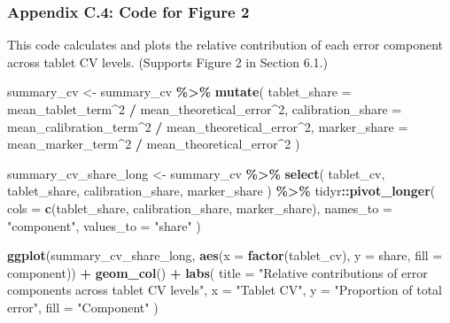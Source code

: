 \documentclass[
  12pt,
]{article}
\newenvironment{Shaded}{\begin{snugshade}}{\end{snugshade}}
\newcommand{\AttributeTok}[1]{\textcolor[rgb]{0.13,0.29,0.53}{#1}}
\newcommand{\DecValTok}[1]{\textcolor[rgb]{0.00,0.00,0.81}{#1}}
\newcommand{\FunctionTok}[1]{\textcolor[rgb]{0.13,0.29,0.53}{\textbf{#1}}}
\newcommand{\NormalTok}[1]{#1}
\newcommand{\OtherTok}[1]{\textcolor[rgb]{0.56,0.35,0.01}{#1}}
\newcommand{\SpecialCharTok}[1]{\textcolor[rgb]{0.81,0.36,0.00}{\textbf{#1}}}
\newcommand{\StringTok}[1]{\textcolor[rgb]{0.31,0.60,0.02}{#1}}
\begin{document}
\subsubsection{Appendix C.4: Code for Figure
2}\label{appendix-c.4-code-for-figure-2}

This code calculates and plots the relative contribution of each error
component across tablet CV levels. (Supports Figure 2 in Section 6.1.)

\begin{Shaded}
\begin{Highlighting}[]
\NormalTok{summary\_cv }\OtherTok{\textless{}{-}}\NormalTok{ summary\_cv }\SpecialCharTok{\%\textgreater{}\%}
  \FunctionTok{mutate}\NormalTok{(}
    \AttributeTok{tablet\_share =}\NormalTok{ mean\_tablet\_term}\SpecialCharTok{\^{}}\DecValTok{2} \SpecialCharTok{/}\NormalTok{ mean\_theoretical\_error}\SpecialCharTok{\^{}}\DecValTok{2}\NormalTok{,}
    \AttributeTok{calibration\_share =}\NormalTok{ mean\_calibration\_term}\SpecialCharTok{\^{}}\DecValTok{2} \SpecialCharTok{/}\NormalTok{ mean\_theoretical\_error}\SpecialCharTok{\^{}}\DecValTok{2}\NormalTok{,}
    \AttributeTok{marker\_share =}\NormalTok{ mean\_marker\_term}\SpecialCharTok{\^{}}\DecValTok{2} \SpecialCharTok{/}\NormalTok{ mean\_theoretical\_error}\SpecialCharTok{\^{}}\DecValTok{2}
\NormalTok{)}

\NormalTok{summary\_cv\_share\_long }\OtherTok{\textless{}{-}}\NormalTok{ summary\_cv }\SpecialCharTok{\%\textgreater{}\%}
  \FunctionTok{select}\NormalTok{(}
\NormalTok{    tablet\_cv,}
\NormalTok{    tablet\_share,}
\NormalTok{    calibration\_share,}
\NormalTok{    marker\_share}
\NormalTok{  ) }\SpecialCharTok{\%\textgreater{}\%}
\NormalTok{  tidyr}\SpecialCharTok{::}\FunctionTok{pivot\_longer}\NormalTok{(}
    \AttributeTok{cols =} \FunctionTok{c}\NormalTok{(tablet\_share, calibration\_share, marker\_share),}
    \AttributeTok{names\_to =} \StringTok{"component"}\NormalTok{,}
    \AttributeTok{values\_to =} \StringTok{"share"}
\NormalTok{  )}

\FunctionTok{ggplot}\NormalTok{(summary\_cv\_share\_long, }\FunctionTok{aes}\NormalTok{(}\AttributeTok{x =} \FunctionTok{factor}\NormalTok{(tablet\_cv),}
                                  \AttributeTok{y =}\NormalTok{ share, }\AttributeTok{fill =}\NormalTok{ component)) }\SpecialCharTok{+}
  \FunctionTok{geom\_col}\NormalTok{() }\SpecialCharTok{+}
  \FunctionTok{labs}\NormalTok{(}
    \AttributeTok{title =} \StringTok{"Relative contributions of error components across tablet CV levels"}\NormalTok{,}
    \AttributeTok{x =} \StringTok{"Tablet CV"}\NormalTok{,}
    \AttributeTok{y =} \StringTok{"Proportion of total error"}\NormalTok{,}
    \AttributeTok{fill =} \StringTok{"Component"}
\NormalTok{  )}
\end{Highlighting}
\end{Shaded}
\end{document}
